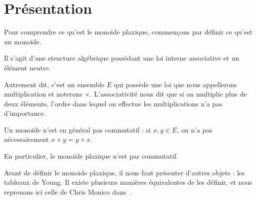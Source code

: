 %
%
%
%
%  

\section{Présentation} \label{sect1.1}
Pour comprendre ce qu'est le monoïde plaxique, commençons par définir ce qu'est un monoïde. 
\begin{definition}[Monoide] \label{def:monoid}
  Il s'agit d'une structure algébrique possédant une loi interne associative et un élément neutre.
\end{definition}
Autrement dit, c'est un ensemble $E$ qui possède une loi que nous appellerons multiplication et noterons $\times$. L'associativité nous dit que si on multiplie plus de deux éléments, l'ordre dans lequel on effectue les multiplications n'a pas d'importance. 
\begin{remark}
  Un monoïde n'est en général pas commutatif : si $x,y \in E$, on n'a pas nécessairement $x \times y = y \times x$.
\end{remark}
\begin{property} \label{prop:commut}
  En particulier, le monoïde plaxique n'est pas commutatif.
\end{property}

Avant de définir le monoïde plaxique, il nous faut présenter d'autres objets : les tableaux de Young. Il existe plusieurs manières équivalentes de les définir, et nous reprenons ici celle de Chris Monico dans~\cite{monico2022division}. 

